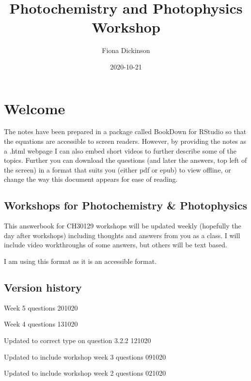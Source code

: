 \documentclass[
]{book}
\title{Photochemistry and Photophysics Workshop}
\author{Fiona Dickinson}
\date{2020-10-21}
\begin{document}
\maketitle

{
\setcounter{tocdepth}{1}
\tableofcontents
}
\hypertarget{welcome}{%
\chapter*{Welcome}\label{welcome}}

The notes have been prepared in a package called BookDown for RStudio so that the equations are accessible to screen readers. However, by providing the notes as a .html webpage I can also embed short videos to further describe some of the topics. Further you can download the questions (and later the answers, top left of the screen) in a format that suits you (either pdf or epub) to view offline, or change the way this document appears for ease of reading.

\hypertarget{workshops-for-photochemistry-photophysics}{%
\section*{Workshops for Photochemistry \& Photophysics}\label{workshops-for-photochemistry-photophysics}}

This answerbook for CH30129 workshops will be updated weekly (hopefully the day after workshops) including thoughts and answers from you as a class. I will include video workthroughs of some answers, but others will be text based.

I am using this format as it is an accessible format.

\hypertarget{version-history}{%
\section*{Version history}\label{version-history}}

Week 5 questions 201020

Week 4 questions 131020

Updated to correct type on question 3.2.2 121020

Updated to include workshop week 3 questions 091020

Updated to include workshop week 2 questions 021020
\end{document}
